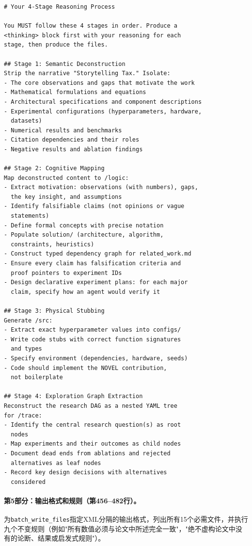 \begin{lstlisting}[basicstyle=\ttfamily\scriptsize]
# Your 4-Stage Reasoning Process

You MUST follow these 4 stages in order. Produce a
<thinking> block first with your reasoning for each
stage, then produce the files.

## Stage 1: Semantic Deconstruction
Strip the narrative "Storytelling Tax." Isolate:
- The core observations and gaps that motivate the work
- Mathematical formulations and equations
- Architectural specifications and component descriptions
- Experimental configurations (hyperparameters, hardware,
  datasets)
- Numerical results and benchmarks
- Citation dependencies and their roles
- Negative results and ablation findings

## Stage 2: Cognitive Mapping
Map deconstructed content to /logic:
- Extract motivation: observations (with numbers), gaps,
  the key insight, and assumptions
- Identify falsifiable claims (not opinions or vague
  statements)
- Define formal concepts with precise notation
- Populate solution/ (architecture, algorithm,
  constraints, heuristics)
- Construct typed dependency graph for related_work.md
- Ensure every claim has falsification criteria and
  proof pointers to experiment IDs
- Design declarative experiment plans: for each major
  claim, specify how an agent would verify it

## Stage 3: Physical Stubbing
Generate /src:
- Extract exact hyperparameter values into configs/
- Write code stubs with correct function signatures
  and types
- Specify environment (dependencies, hardware, seeds)
- Code should implement the NOVEL contribution,
  not boilerplate

## Stage 4: Exploration Graph Extraction
Reconstruct the research DAG as a nested YAML tree
for /trace:
- Identify the central research question(s) as root
  nodes
- Map experiments and their outcomes as child nodes
- Document dead ends from ablations and rejected
  alternatives as leaf nodes
- Record key design decisions with alternatives
  considered
\end{lstlisting}

\paragraph{第5部分：输出格式和规则（第456--482行）。}
为\texttt{batch\_write\_files}指定XML分隔的输出格式，列出所有15个必需文件，并执行九个不变规则（例如"所有数值必须与论文中所述完全一致"，"绝不虚构论文中没有的论断、结果或启发式规则"）。

